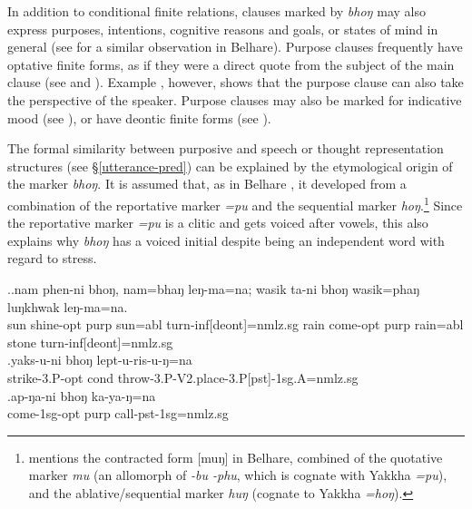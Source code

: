 In addition to conditional finite relations, clauses marked by \emph{bhoŋ} may also express purposes, intentions, cognitive reasons and goals, or states of mind in general (see \citealt{Bickel1993Belhare} for a similar observation in Belhare).  Purpose clauses frequently have optative finite forms, as if they were a direct quote from the subject of the main clause (see \Next[a] and  \Next[b]). Example \Next[c], however, shows that the purpose clause can also take the perspective of the speaker. Purpose clauses may also be marked for indicative mood (see \NNext[a]), or have deontic finite forms (see \NNext[b]). 

The formal similarity between purposive and speech or thought representation structures (see §\ref{utterance-pred}) can be explained by the etymological origin of the marker \emph{bhoŋ}. It is assumed that, as in Belhare \citep{Bickel1993Belhare},  it developed from a combination of the reportative  marker \emph{=pu} and the sequential marker \emph{hoŋ}.\footnote{\citet{Bickel1993Belhare} mentions the contracted form [muŋ] in Belhare, combined of the quotative marker \emph{mu} (an allomorph of \emph{-bu \ti -phu}, which is cognate with Yakkha \emph{=pu}), and the ablative/sequential marker \emph{huŋ} (cognate to Yakkha \emph{=hoŋ}).}    Since the reportative marker \emph{=pu} is a clitic and gets voiced after vowels, this also explains why \emph{bhoŋ} has a voiced initial despite being an independent word with regard to stress.

\ex.\ag.nam phen-ni     bhoŋ, nam=bhaŋ   leŋ-ma=na; wasik ta-ni      bhoŋ wasik=phaŋ   luŋkhwak leŋ-ma=na.\\
sun shine{\sc [3sg;sbjv]-opt} {\sc purp}   sun{\sc =abl}   turn{\sc -inf[deont]=nmlz.sg}  rain come{\sc [3sg;sbjv]-opt} {\sc purp} rain{\sc =abl} stone turn{\sc -inf[deont]=nmlz.sg}\\
 
\bg.yaks-u-ni bhoŋ lept-u-ris-u-ŋ=na\\
strike{\sc -3.P-opt} {\sc cond}  throw{\sc -3.P-V2.place-3.P[pst]-1sg.A=nmlz.sg}\\
\bg.ap-ŋa-ni bhoŋ ka-ya-ŋ=na\\
come{\sc -1sg-opt} {\sc purp} call{\sc -pst-1sg=nmlz.sg}\\

